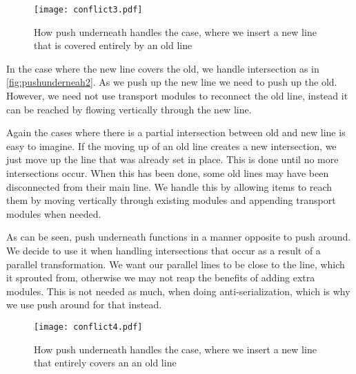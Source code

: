 \begin{figure}[H]
\centering
\texttt{[image: conflict3.pdf]}
\caption{How push underneath handles the case, where we insert a new line that is covered entirely by an old line}
\label{fig:pushunderneath1}
\end{figure}

In the case where the new line covers the old, we handle intersection as in \cref{fig:pushunderneah2}. As we push up the new line we need to push up the old. However, we need not use transport modules to reconnect the old line, instead it can be reached by flowing vertically through the new line.

Again the cases where there is a partial intersection between old and new line is easy to imagine. If the moving up of an old line creates a new intersection, we just move up the line that was already set in place. This is done until no more intersections occur. When this has been done, some old lines may have been disconnected from their main line. We handle this by allowing items to reach them by moving vertically through existing modules and appending transport modules when needed.  

As can be seen, push underneath functions in a manner opposite to push around. We decide to use it when handling intersections that occur as a result of a parallel transformation. We want our parallel lines to be close to the line, which it sprouted from, otherwise we may not reap the benefits of adding extra modules. This is not needed as much, when doing anti-serialization, which is why we use push around for that instead.

  

\begin{figure}[H]
\centering
\texttt{[image: conflict4.pdf]}
\caption{How push underneath handles the case, where we insert a new line that  entirely covers an an old line}
\label{fig:pushunderneath2}
\end{figure}

